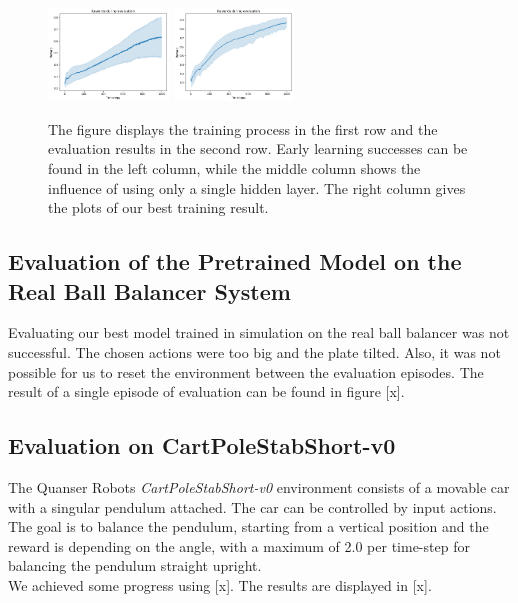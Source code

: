 \begin{figure}[H]
	\includegraphics[width=0.285\textwidth]{plots/DDPGballbalancer24-2-16.png}
	\includegraphics[width=0.285\textwidth]{plots/DDPGballbalancer26-2-20.png}

	\caption{The figure displays the training process in the first row and the evaluation results in the second row. Early learning successes can be found in the left column, while the middle column shows the influence of using only a single hidden layer. The right column gives the plots of our best training result.}
	\label{ddpg:ball}
\end{figure}
\subsection{Evaluation of the Pretrained Model on the Real Ball Balancer System}
Evaluating our best model trained in simulation on the real ball balancer was not successful. The chosen actions were too big and the plate tilted. Also, it was not possible for us to reset the environment between the evaluation episodes. The result of a single episode of evaluation can be found in figure [x].
\subsection{Evaluation on CartPoleStabShort-v0}
The Quanser Robots \textit{CartPoleStabShort-v0} environment consists of a movable car with a singular pendulum attached. The car can be controlled by input actions. The goal is to balance the pendulum, starting from a vertical position and the reward is depending on the angle, with a maximum of 2.0 per time-step for balancing the pendulum straight upright.\\
We achieved some progress using [x]. The results are displayed in [x].
